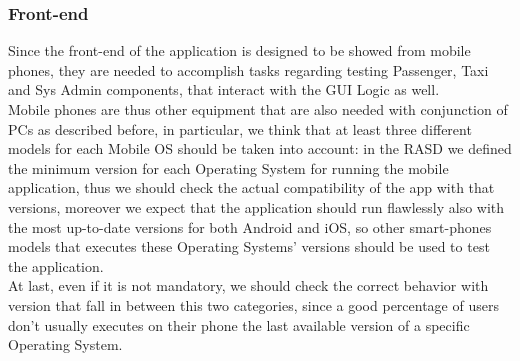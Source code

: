 \subsubsection{Front-end}
Since the front-end of the application is designed to be showed from mobile phones, they are needed to accomplish tasks regarding testing Passenger, Taxi and Sys Admin components, that interact with the GUI Logic as well. \\
Mobile phones are thus other equipment that are also needed with conjunction of PCs as described before, in particular, we think that at least three different models for each Mobile OS should be taken into account: in the RASD we defined the minimum version for each Operating System for running the mobile application, thus we should check the actual compatibility of the app with that versions, moreover we expect that the application should run flawlessly also with the most up-to-date versions for both Android and iOS, so other smart-phones models that executes these Operating Systems' versions should be used to test the application. \\ At last, even if it is not mandatory, we should check the correct behavior with version that fall in between this two categories, since a good percentage of users don't usually executes on their phone the last available version of a specific Operating System.